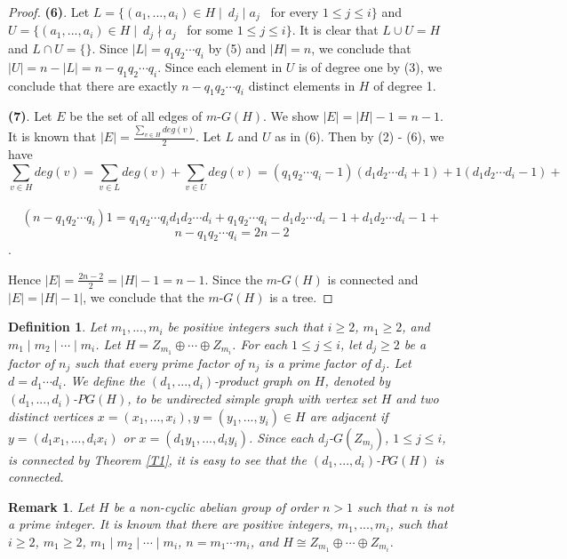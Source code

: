 \documentclass{amsart}
\theoremstyle{plain}
\newtheorem{defi}[thm]{Definition}
\newtheorem{remk}[thm]{Remark}
\begin{document}
\begin{proof}
\vskip 0.1in
{\bf (6)}.  Let $L = \{(a_1, ..., a_i) \in H \mid \   d_j \mid a_j$ \ for every $1 \leq j \leq i\}$ and $U = \{(a_1, ..., a_i) \in H \mid \   d_j \nmid a_j$ \ for some $1 \leq j \leq i\}$. It is clear that $L \cup U = H$ and $L \cap U = \{\}$. Since $|L| = q_1q_2 \cdots q_i$ by (5) and $|H| = n$, we conclude that $|U| = n - |L| = n - q_1q_2 \cdots q_i$.  Since each element in $U$ is of degree one by (3), we conclude that there are exactly $n - q_1q_2 \cdots q_i$ distinct elements in $H$ of degree 1.

\vskip 0.1in
{\bf (7)}. Let $E$ be the set of all edges of $m$-$G(H)$. We show $|E| = |H| - 1 = n - 1$. It is known that $|E| = \frac{\sum_{v \in H} deg(v)}{2}$. Let $L$ and $U$ as in (6). Then by (2) - (6), we have
$$\sum_{v \in H} deg(v) = \sum_{v \in L} deg(v) + \sum_{v \in U} deg(v) = (q_1q_2 \cdots q_i - 1)(d_1d_2 \cdots d_i + 1) + 1(d_1d_2\cdots d_i - 1) + $$\\ $$(n - q_1q_2 \cdots q_i)1 = q_1q_2 \cdots q_i d_1d_2\cdots d_i + q_1q_2 \cdots q_i - d_1d_2\cdots d_i - 1 + d_1d_2\cdots d_i - 1 +$$ \newline   $$n - q_1q_2\cdots q_i = 2n - 2$$.

Hence $|E| = \frac{2n - 2}{2} = |H| -1 = n-1$. Since the $m$-$G(H)$ is connected and $|E| = |H| - 1|$, we conclude that the $m$-$G(H)$ is a tree.

\end{proof}
\begin{defi}
	Let $m_1, ..., m_i$ be positive integers such that $i \geq 2$, $m_1 \geq 2$, and $m_1 \mid m_2 \mid \cdots \mid m_i$. Let $H = Z_{m_1} \oplus \cdots \oplus Z_{m_i}$. For each $1 \leq j \leq i$, let $d_j \geq 2$ be a factor of $n_j$ such that every prime factor of $n_j$ is a prime factor of $d_j$. Let $d = d_1 \cdots d_i$. We define the {\it $(d_1, ..., d_i)$-product graph} on $H$, denoted by $(d_1, ... , d_i)$-$PG(H)$, to be undirected simple graph with vertex set $H$ and two distinct vertices $x = (x_1, ..., x_i), y = (y_1, ... , y_i) \in H$ are adjacent if $y=(d_1x_1, ..., d_ix_i)$ or $x = (d_1y_1, ... , d_iy_i)$. Since each $d_j$-$G(Z_{m_j})$, $1\leq j \leq i$, is connected by Theorem \ref{T1}, it is easy to see that the $(d_1, ... , d_i)$-$PG(H)$ is connected.
		\end{defi}
		\begin{remk}\label{r1}
			Let $H$ be a non-cyclic abelian group of order $n > 1$ such that $n$ is not a prime integer. It is known that there are positive integers, $m_1, ..., m_i$, such that $i \geq 2$, $m_1 \geq 2$, $m_1 \mid m_2 \mid \cdots \mid m_i$, $n = m_1\cdots m_i$, and $H\cong Z_{m_1} \oplus \cdots \oplus Z_{m_i}$.
			\end{remk}
\end{document}
